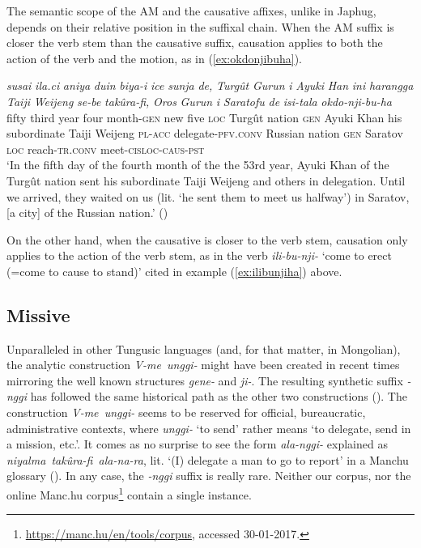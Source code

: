 \documentclass{article}
\newcommand{\ipa}[1]{\textit{{\phon\mbox{#1}}}} %
\begin{document}
The semantic scope of the AM and the causative affixes, unlike in Japhug, depends on their relative position in the suffixal chain. When the AM suffix is closer the verb stem than the causative suffix, causation applies to both the action of the verb and the motion, as in (\ref{ex:okdonjibuha}).

\begin{exe}
\ex \label{ex:okdonjibuha}
\gll 
\ipa{susai}	\ipa{ila.ci}	\ipa{aniya}	\ipa{duin}	\ipa{biya-i}	\ipa{ice}	\ipa{sunja}	\ipa{de,}	\ipa{Turgût}	\ipa{Gurun}	\ipa{i}	\ipa{Ayuki}	\ipa{Han}	\ipa{ini}	\ipa{harangga}	\ipa{Taiji}	\ipa{Weijeng}	\ipa{se-be}	\ipa{takûra-fi,}	\ipa{Oros}	\ipa{Gurun}	\ipa{i}	\ipa{Saratofu}	\ipa{de}	\ipa{isi-tala}	\ipa{okdo-nji-bu-ha} \\
fifty third year four month-\textsc{gen} new five \textsc{loc} Turgût nation \textsc{gen} Ayuki Khan his subordinate Taiji Weijeng \textsc{pl-acc} delegate-\textsc{pfv.conv} Russian nation \textsc{gen} Saratov \textsc{loc} reach-\textsc{tr.conv} meet-\textsc{cisloc-caus-pst} \\
\glt ‘In the fifth day of the fourth month of the the 53rd year, Ayuki Khan of the Turgût nation sent his subordinate Taiji Weijeng and others in delegation. Until we arrived,
they waited on us (lit. `he sent them to meet us halfway’) in Saratov, [a city] of the Russian nation.’ (\citealt[175;88b-89a]{shunjuu64tulishen})
\end{exe}

On the other hand, when the causative is closer to the verb stem, causation only applies to the action of the verb stem, as in the verb \ipa{ili-bu-nji-} `come to erect (=come to cause to stand)' cited in example (\ref{ex:ilibunjiha}) above.

\subsection{Missive} \label{sec:nggi}
Unparalleled in other Tungusic languages (and, for that matter, in Mongolian), the analytic construction \ipa{V-me unggi-} might have been  created in recent times mirroring the well known structures \ipa{gene-} and \ipa{ji-}. The resulting synthetic suffix \ipa{-nggi} has followed the same historical path as the other two constructions (\citealt[163]{zaxarov10manchu}). The construction  \ipa{V-me unggi-} seems to be reserved for official, bureaucratic, administrative contexts, where  \ipa{unggi-} ‘to send’ rather means ‘to delegate, send in a mission, etc.’. It comes as no surprise to see the form  \ipa{ala-nggi-} explained as  \ipa{niyalma takûra-fi ala-na-ra}, lit. ‘(I) delegate a man to go to report’ in a Manchu glossary (\citealt[157]{enxbat16leksika}).  In any case, the \ipa{-nggi} suffix is really rare. Neither our corpus, nor the online Manc.hu corpus\footnote{ \url{https://manc.hu/en/tools/corpus}, accessed 30-01-2017.} contain a single instance.
\end{document}
